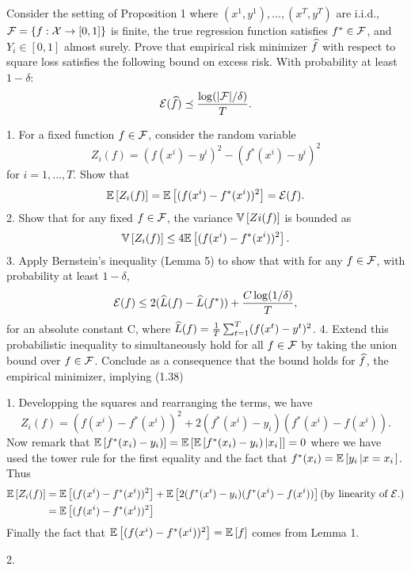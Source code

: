 \begin{exercise}[]{}
Consider the setting of Proposition 1 where $ (x^{1}, y^{1}),\ldots,(x^{T},y^{T})$ are i.i.d., $\mathcal{F} = \{f : \mathcal{X} \to [0,1] \}$ is finite,  
the true regression function satisfies $f^* \in \mathcal{F}$, and $Y_i \in [0, 1]$ almost surely. Prove that empirical risk minimizer $\widehat f$ with respect 
to square loss satisfies the following bound on excess risk. With probability at least $1 - \delta$:
\begin{equation*}
    \mathcal{E}(\widehat f) \preceq \frac{\log(|\mathcal{F}|/\delta)}{T}.
\end{equation*}
\end{exercise}

1. For a fixed function $f \in \mathcal{F}$, consider the random variable 
\[Z_i(f) = (f(x^i)-y^i)^2 -(f^*(x^i)-y^i)^2\]
 for $i=1,\ldots,T.$ Show that
 \[ \mathbb{E}\left[Z_i(f)\right] = \mathbb{E}\left[(f(x^i)- f^*(x^i))^2\right] = \mathcal{E}(f).\]
2. Show that for any fixed $f \in \mathcal{F}$, the variance $\mathbb{V}\left[Zi(f)\right]$ is bounded as
\[ \mathbb{V}\left[Z_i(f)\right]\leq 4\mathbb{E}\left[(f(x^i)-f^*(x^i))^2\right].\]
3. Apply Bernstein’s inequality (Lemma 5) to show that with for any $f \in \mathcal{F}$, with probability
at least $1-\delta$,
\[ \mathcal{E}(f) \leq 2(\widehat L(f)-\widehat L(f^*))+\frac{C \log(1/\delta)}{T},\] 
for an absolute constant C, where $\widehat L(f) = \frac{1}{T} \sum_{t=1}^T (f(x^t) - y^t)^2$.
4. Extend this probabilistic inequality to simultaneously hold for all $f \in \mathcal{F}$ by taking the 
union bound over $f \in \mathcal{F}$. Conclude as a consequence that the bound holds for $\widehat f$, the empirical minimizer, implying (1.38)
\begin{solution}[]
1. Developping the squares and rearranging the terms, we have
   \[Z_i(f) = (f(x^i)-f^*(x^i))^2 +2(f^*(x^i)-y_i)(f^*(x^i)-f(x^i)).\] 
 Now remark that $\mathbb{E}\left[f^*(x_i)-y_i)\right]= \mathbb{E}\left[\mathbb{E}\left[f^*(x_i)-y_i)\left|x_i\right.\right]\right] = 0$ 
 where we have used the tower rule for the first equality and the fact that $f^*(x_i)=\mathbb{E}\left[y_i\left|x=x_i\right.\right]$.
Thus
\begin{align*}
    \mathbb{E}\left[Z_i(f)\right] &= \mathbb{E}\left[(f(x^i)-f^*(x^i))^2\right] + \mathbb{E}\left[2(f^*(x^i)-y_i)(f^*(x^i)-f(x^i))\right] \text{(by linearity of $\mathcal{E}{.}$)} \\
                &= \mathbb{E}\left[(f(x^i)-f^*(x^i))^2\right]
\end{align*}
Finally the fact that $\mathbb{E}\left[(f(x^i)-f^*(x^i))^2\right]= \mathbb{E}\left[f\right]$ comes from Lemma 1.

2.
\end{solution}
